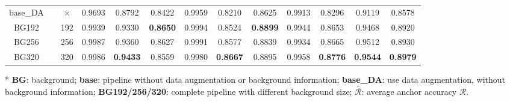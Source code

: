 \documentclass[letterpaper, 10 pt, conference]{ieeeconf}  %
\begin{document}
\begin{table}
\begin{threeparttable}
\begin{tabular}{ccc|ccc|ccc|ccc!{\color{black}\vrule}c}
			base\_DA               & \checkmark                          & $\times$                          & 0.9693 & {}0.8792          & {}0.8422              & 0.9959 & {}0.8210          & {}0.8625          & 0.9913 & {}0.8296              & {}0.9119              & {}0.8578           \\
			BG192                  & \checkmark                          & 192                         & 0.9939 & {}0.9330          & {}\textbf{0.8650}  & 0.9994 & {}0.8524           & {}\textbf{0.8899}  & 0.9944 & {}0.8653           & {}0.9468            & {}0.8920           \\
			BG256                  & \checkmark                          & 256                         & 0.9987 & {}0.9360          & {}0.8627          & 0.9991 & {}0.8577          & {}0.8839           & 0.9934 & {}0.8665           & {}0.9512          & {}0.8930           \\
			BG320                  & \checkmark                          & 320                         & 0.9986 & {}\textbf{0.9433}  & {}0.8559          & 0.9980 & {}\textbf{0.8667}  & {}0.8895           & 0.9958 & {}\textbf{0.8776}  & {}\textbf{0.9544}  & {}\textbf{0.8979}   \\
			\hline
		\end{tabular}
		\begin{tablenotes}
			\footnotesize
			\item[*] \textbf{BG}: background; \textbf{base}: pipeline without data augmentation or background information; \textbf{base\_DA}: use data augmentation, without background information; \textbf{BG192/256/320}: complete pipeline with different background size; \textbf{$\bar{\mathcal{R}}$}: average anchor accuracy $\mathcal{R}$.
		\end{tablenotes}
	\end{threeparttable}
\end{table}
\end{document}
